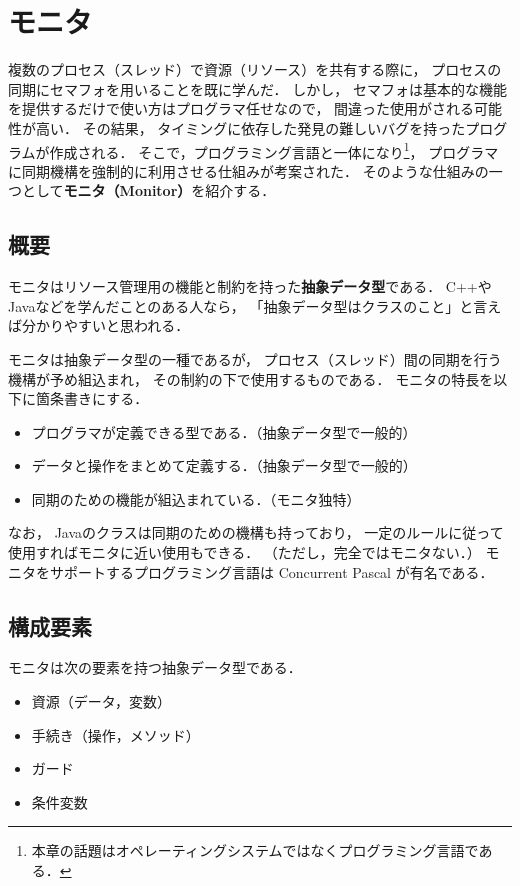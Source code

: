 \chapter{モニタ}
\label{monitor}
複数のプロセス（スレッド）で資源（リソース）を共有する際に，
プロセスの同期にセマフォを用いることを既に学んだ．
しかし，
セマフォは基本的な機能を提供するだけで使い方はプログラマ任せなので，
間違った使用がされる可能性が高い．
その結果，
タイミングに依存した発見の難しいバグを持ったプログラムが作成される．
そこで，プログラミング言語と一体になり\footnote{
本章の話題はオペレーティングシステムではなくプログラミング言語である．}，
プログラマに同期機構を強制的に利用させる仕組みが考案された．
そのような仕組みの一つとして{\bf モニタ（Monitor）}を紹介する．

\section{概要}
モニタはリソース管理用の機能と制約を持った{\bf 抽象データ型}\cite{AbstractDataType}である．
C++やJavaなどを学んだことのある人なら，
「抽象データ型はクラスのこと」と言えば分かりやすいと思われる．

モニタは抽象データ型の一種であるが，
プロセス（スレッド）間の同期を行う機構が予め組込まれ，
その制約の下で使用するものである．
モニタの特長を以下に箇条書きにする．

\begin{itemize}
\item プログラマが定義できる型である．（抽象データ型で一般的）
\item データと操作をまとめて定義する．（抽象データ型で一般的）
\item 同期のための機能が組込まれている．（モニタ独特）
\end{itemize}

なお，
Javaのクラスは同期のための機構も持っており，
一定のルールに従って使用すればモニタに近い使用もできる．
（ただし，完全ではモニタない．）
モニタをサポートするプログラミング言語は Concurrent Pascal が有名である．

\section{構成要素}
モニタは次の要素を持つ抽象データ型である．

\begin{itemize}
\item 資源（データ，変数）
\item 手続き（操作，メソッド）
\item ガード
\item 条件変数
\end{itemize}

